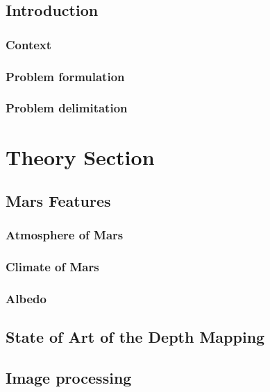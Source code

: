 \documentclass[12pt,a4paper,fleqn, onesside]{report}
\begin{document}
\pagebreak
{}
\setcounter{page}{1}
\setcounter{tocdepth}{4}
\setcounter{secnumdepth}{4} 
\def\chaptername{Part}

\tableofcontents
\newpage
{}

\section*{Introduction}
\subsection*{Context}

\subsection*{Problem formulation}

\subsection*{Problem delimitation}


\chapter{Theory Section}
\section{Mars Features}

\subsection{Atmosphere of Mars}

\subsection{Climate of Mars}

\subsection{Albedo}

\section{State of Art of the Depth Mapping}


\section{Image processing}

\end{document}
